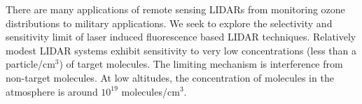 There are many applications of remote sensing LIDARs from monitoring ozone distributions \cite{Godin-Beekmann:2003a} to military applications. We seek to explore the selectivity and sensitivity limit of laser induced fluorescence based LIDAR techniques. Relatively modest LIDAR systems \cite{Hoffner:2004a} exhibit sensitivity to very low concentrations (less than a particle/cm$^3$) of target molecules. The limiting mechanism is interference from non-target molecules. At low altitudes, the concentration of molecules in the atmosphere is around $10^{19}$ molecules/cm$^3$.

